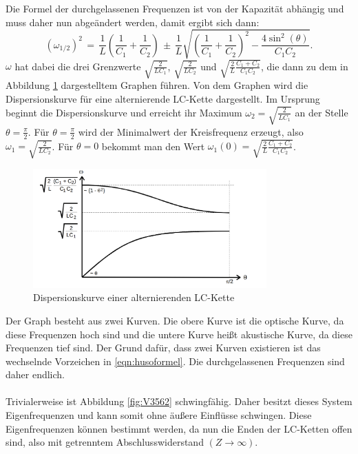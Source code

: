 \documentclass[
  bibliography=totoc,     %
  captions=tableheading,  %
  titlepage=firstiscover, %
]{scrartcl}
\begin{document}
Die Formel der durchgelassenen Frequenzen ist von der Kapazität abhängig und muss
daher nun abgeändert werden, damit ergibt sich dann:
\begin{equation}
  (\omega_{1/2})^2\,=\,\frac{1}{L}\left(\frac{1}{C_1}+\frac{1}{C_2}\right)\,\pm\,\frac{1}{L}\sqrt{\left(\frac{1}{C_1}+\frac{1}{C_2}\right)^2-\frac{4\sin^2(\theta)}{C_1C_2}}.
  \label{eqn:husoformel}
\end{equation}
$\omega$ hat dabei die drei Grenzwerte $\sqrt{\frac{2}{LC_1}}$,
$\sqrt{\frac{2}{LC_2}}$ und $\sqrt{\frac{2}{L}\frac{C_1+C_2}{C_1C_2}}$, die
dann zu dem in Abbildung \ref{fig:V3564} dargestelltem Graphen führen. Von dem
Graphen wird die Dispersionskurve für eine alternierende LC-Kette dargestellt.
Im Ursprung beginnt die Dispersionskurve und erreicht ihr Maximum
$\omega_2=\sqrt{\frac{2}{LC_1}}$ an der Stelle $\theta=\frac{\pi}{2}$.
Für $\theta=\frac{\pi}{2}$ wird der Minimalwert der Kreisfrequenz erzeugt,
also $\omega_1=\sqrt{\frac{2}{LC_2}}$.
Für $\theta=0$ bekommt man den Wert $\omega_1(0)=\sqrt{\frac{2}{L}\frac{C_1+C_2}{C_1C_2}}$.
\begin{figure}[htb]
  \centering
  \includegraphics[width=0.8\textwidth]{V3564.png}
  \caption{Dispersionskurve einer alternierenden LC-Kette }
  \label{fig:V3564}
\end{figure}
Der Graph besteht aus zwei Kurven. Die obere Kurve ist die optische Kurve, da
diese Frequenzen hoch sind und die untere Kurve heißt akustische Kurve, da diese
Frequenzen tief sind. Der Grund dafür, dass zwei Kurven existieren ist das
wechselnde Vorzeichen in \eqref{eqn:husoformel}. Die durchgelassenen Frequenzen
sind daher endlich.\\
\\
Trivialerweise ist Abbildung \ref{fig:V3562} schwingfähig. Daher besitzt dieses System
Eigenfrequenzen und kann somit ohne äußere Einflüsse schwingen. Diese
Eigenfrequenzen können bestimmt werden, da nun die Enden der LC-Ketten offen
sind, also mit getrenntem Abschlusswiderstand $\left( Z \to \infty \right)$.
\end{document}
